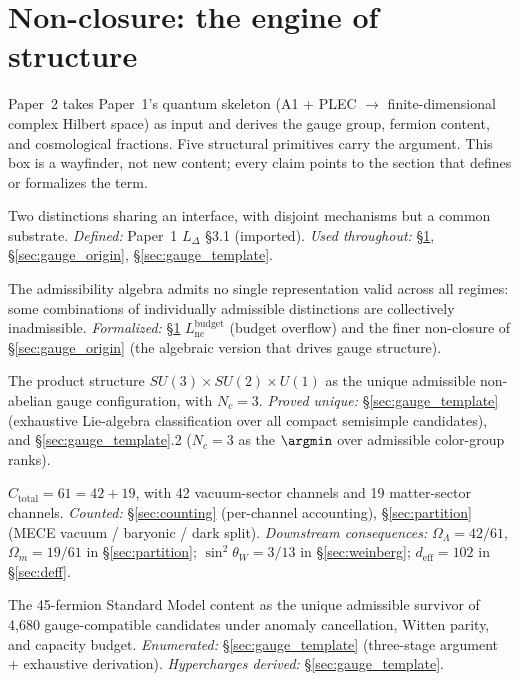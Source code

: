 \documentclass[11pt]{article}
\begin{document}
\section{Non-closure: the engine of structure}
\label{sec:nonclosure}

\begin{tcolorbox}[apfbox, title={Operational primitives: where each structural term is defined and used}]
Paper~2 takes Paper~1's quantum skeleton (A1 + PLEC $\rightarrow$ finite-dimensional complex Hilbert space) as input and derives the gauge group, fermion content, and cosmological fractions.  Five structural primitives carry the argument.  This box is a wayfinder, not new content; every claim points to the section that defines or formalizes the term.

\begin{description}[topsep=2pt,itemsep=2pt]
  \item[Co-located distinctions.]  Two distinctions sharing an interface, with disjoint mechanisms but a common substrate.  \emph{Defined:} Paper~1 $L_\Delta$ \S 3.1 (imported).  \emph{Used throughout:} \S\ref{sec:nonclosure}, \S\ref{sec:gauge_origin}, \S\ref{sec:gauge_template}.
  \item[Non-closure.]  The admissibility algebra admits no single representation valid across all regimes: some combinations of individually admissible distinctions are collectively inadmissible.  \emph{Formalized:} \S\ref{sec:nonclosure} $L_{\mathrm{nc}}^{\mathrm{budget}}$ (budget overflow) and the finer non-closure of \S\ref{sec:gauge_origin} (the algebraic version that drives gauge structure).
  \item[Gauge template.]  The product structure $SU(3)\times SU(2)\times U(1)$ as the unique admissible non-abelian gauge configuration, with $N_c = 3$.  \emph{Proved unique:} \S\ref{sec:gauge_template} (exhaustive Lie-algebra classification over all compact semisimple candidates), and \S\ref{sec:gauge_template}.2 ($N_c = 3$ as the $\argmin$ over admissible color-group ranks).
  \item[Capacity partition.]  $C_{\mathrm{total}} = 61 = 42 + 19$, with 42 vacuum-sector channels and 19 matter-sector channels.  \emph{Counted:} \S\ref{sec:counting} (per-channel accounting), \S\ref{sec:partition} (MECE vacuum / baryonic / dark split).  \emph{Downstream consequences:} $\Omega_\Lambda = 42/61$, $\Omega_m = 19/61$ in \S\ref{sec:partition}; $\sin^2\theta_W = 3/13$ in \S\ref{sec:weinberg}; $d_{\mathrm{eff}} = 102$ in \S\ref{sec:deff}.
  \item[Fermion template.]  The 45-fermion Standard Model content as the unique admissible survivor of 4,680 gauge-compatible candidates under anomaly cancellation, Witten parity, and capacity budget.  \emph{Enumerated:} \S\ref{sec:gauge_template} (three-stage argument + exhaustive derivation).  \emph{Hypercharges derived:} \S\ref{sec:gauge_template}.
\end{description}


\end{tcolorbox}
\end{document}

